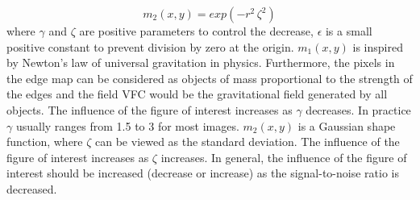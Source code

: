 \begin{equation}
{m} _{2} ( x,y ) =exp(-r^{2}\, \zeta ^{2})
\end{equation}
where $\gamma$ and $\zeta$ are positive parameters to control the decrease, $\epsilon$ is a small positive constant to prevent division by zero at the origin. ${m} _{1} ( x,y )$ is inspired by Newton’s law  of universal gravitation in physics. Furthermore, the pixels in the edge map can be considered as objects of mass proportional to the strength of the edges and the field VFC would be the gravitational field generated by all objects. The influence of the figure of interest increases as $\gamma$ decreases. In practice $\gamma$ usually ranges from 1.5 to 3 for most images. ${m} _{2} ( x,y )$ is a Gaussian shape function, where $\zeta$ can be viewed as the standard deviation. The influence of the figure of interest increases as $\zeta$ increases. In general, the influence of the figure of interest should be increased (decrease or increase) as the signal-to-noise ratio is decreased.\cite{VFC}


